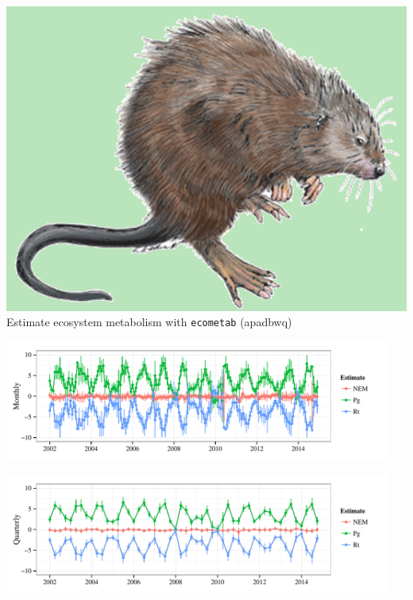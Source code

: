 \documentclass[serif]{beamer}\usepackage[]{graphicx}\usepackage[]{color}
\newenvironment{knitrout}{}{} %
\begin{document}
\begin{frame}[fragile]{\includegraphics[width=0.05\paperwidth]{fig/muskrat.png}\hspace{0.07in}{\bf SWMPrats.net: The SWMPr package}}
Estimate ecosystem metabolism with \texttt{ecometab} (apadbwq)

\begin{knitrout}
\color{fgcolor}

{\centering \includegraphics[width=0.95\textwidth]{fig//ecometab1-1} 

}



\end{knitrout}
\begin{knitrout}
\color{fgcolor}

{\centering \includegraphics[width=0.95\textwidth]{fig//ecometab2-1} 

}



\end{knitrout}
\end{frame}
\end{document}
